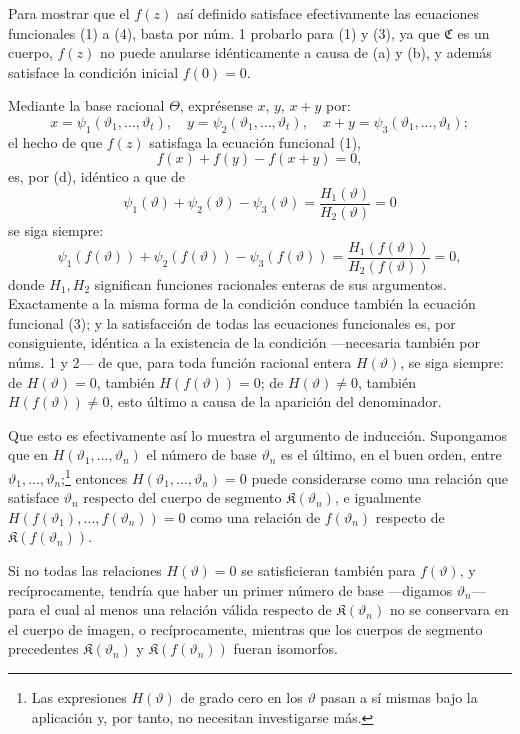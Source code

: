 Para mostrar que el $f(z)$ así definido satisface efectivamente las ecuaciones funcionales (1) a (4), basta por núm. 1 probarlo para (1) y (3), ya que $\mathfrak C$ es un cuerpo, $f(z)$ no puede anularse idénticamente a causa de (a) y (b), y además satisface la condición inicial $f(0)=0$.

Mediante la base racional $\Theta$, exprésense $x$, $y$, $x+y$ por:
\[
x=\psi_1(\vartheta_1,\ldots,\vartheta_t),\quad
 y=\psi_2(\vartheta_1,\ldots,\vartheta_t),\quad
 x+y=\psi_3(\vartheta_1,\ldots,\vartheta_t);
\]
el hecho de que $f(z)$ satisfaga la ecuación funcional (1),
\[
f(x)+f(y)-f(x+y)=0,
\]
es, por (d), idéntico a que de
\[
\psi_1(\vartheta)+\psi_2(\vartheta)-\psi_3(\vartheta)=\frac{H_1(\vartheta)}{H_2(\vartheta)}=0
\]
se siga siempre:
\[
\psi_1(f(\vartheta))+\psi_2(f(\vartheta))-\psi_3(f(\vartheta))
=\frac{H_1(f(\vartheta))}{H_2(f(\vartheta))}=0,
\]
donde $H_1,H_2$ significan funciones racionales enteras de sus argumentos. Exactamente a la misma forma de la condición conduce también la ecuación funcional (3); y la satisfacción de todas las ecuaciones funcionales es, por consiguiente, idéntica a la existencia de la condición ---necesaria también por núms. 1 y 2--- de que, para toda función racional entera $H(\vartheta)$, se siga siempre: de $H(\vartheta)=0$, también $H(f(\vartheta))=0$; de $H(\vartheta)\ne0$, también $H(f(\vartheta))\ne0$, esto último a causa de la aparición del denominador.

Que esto es efectivamente así lo muestra el argumento de inducción. Supongamos que en $H(\vartheta_1,\ldots,\vartheta_n)$ el número de base $\vartheta_n$ es el último, en el buen orden, entre $\vartheta_1,\ldots,\vartheta_n$;\footnote{Las expresiones $H(\vartheta)$ de grado cero en los $\vartheta$ pasan a sí mismas bajo la aplicación y, por tanto, no necesitan investigarse más.} entonces $H(\vartheta_1,\ldots,\vartheta_n)=0$ puede considerarse como una relación que satisface $\vartheta_n$ respecto del cuerpo de segmento $\mathfrak K(\vartheta_n)$, e igualmente $H(f(\vartheta_1),\ldots,f(\vartheta_n))=0$ como una relación de $f(\vartheta_n)$ respecto de $\mathfrak K(f(\vartheta_n))$.

Si no todas las relaciones $H(\vartheta)=0$ se satisficieran también para $f(\vartheta)$, y recíprocamente, tendría que haber un primer número de base ---digamos $\vartheta_n$--- para el cual al menos una relación válida respecto de $\mathfrak K(\vartheta_n)$ no se conservara en el cuerpo de imagen, o recíprocamente, mientras que los cuerpos de segmento precedentes $\mathfrak K(\vartheta_n)$ y $\mathfrak K(f(\vartheta_n))$ fueran isomorfos.

